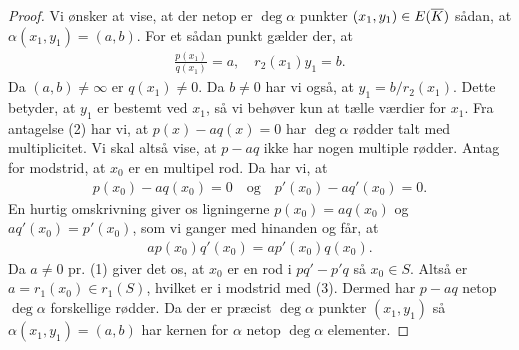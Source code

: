 \begin{proof}
Vi ønsker at vise, at der netop er $\deg \alpha$ punkter $(x_1, y_1) \in E(\overline{K})$ sådan,
at $\alpha(x_1, y_1) = (a, b)$. For et sådan punkt gælder der, at 
\begin{align*}
	\frac{p(x_1)}{q(x_1)} = a, \quad r_2(x_1) y_1 = b.
\end{align*}
Da $(a, b) \neq \infty$ er $q(x_1) \neq 0$. %
Da $b \neq 0$ har vi også, at $y_1 = b / r_2(x_1)$. Dette betyder, at $y_1$ er bestemt
ved $x_1$, så vi behøver kun at tælle værdier for $x_1$. Fra antagelse (2) har vi, at 
$p(x) - aq(x) = 0$ har $\deg \alpha$ rødder talt med multiplicitet. Vi skal altså vise,
at $p-aq$ ikke har nogen multiple rødder. Antag for modstrid, at $x_0$ er en multipel
rod. Da har vi, at
\begin{align*}
	p(x_0) - aq(x_0) = 0 \quad \text{og} \quad p'(x_0) - aq'(x_0) = 0.
\end{align*}
En hurtig omskrivning giver os ligningerne $p(x_0)=aq(x_0)$ og $aq'(x_0)=p'(x_0)$, 
som vi ganger med hinanden og får, at 
\begin{align*}
	a p(x_0)q'(x_0) = ap'(x_0)q(x_0).
\end{align*} 
Da $a \neq 0$ pr. (1) giver det os, at $x_0$ er en rod i $pq'-p'q$ så $x_0 \in S$.
Altså er $a=r_1(x_0) \in r_1(S)$, hvilket er i modstrid med (3). Dermed har 
$p-aq$ netop $\deg \alpha$ forskellige rødder. Da der er præcist $\deg \alpha$ 
punkter $(x_1, y_1)$ så $\alpha(x_1, y_1) = (a, b)$ har kernen for $\alpha$ netop
$\deg \alpha$ elementer.










\end{proof}

















